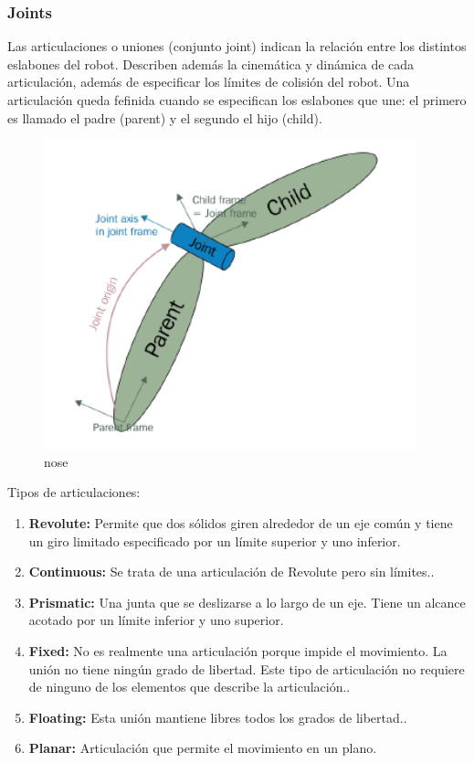                                 \newpage

        
        \subsubsection{Joints}
        
        Las articulaciones o uniones (conjunto joint) indican la relación entre los distintos eslabones del robot. Describen además la cinemática y dinámica de cada articulación, además de especificar los límites de colisión del robot. Una articulación queda fefinida cuando se especifican los eslabones que une: el primero es llamado el padre (parent) y el segundo el hijo (child).
        
        \begin{figure}[htb]
            \centering
            \includegraphics[width=0.65\linewidth]{Main/Chapter3/Images3/3-8/representacion-de-una-articulacion-en-URDF.png}
            \caption{nose}
            \label{f:Cap3-8_nose_nose}
        \end{figure} 
        
        Tipos de articulaciones:
        
        \begin{enumerate}
           \item \textbf{Revolute:} Permite que dos sólidos giren alrededor de un eje común y tiene un giro limitado especificado por un límite superior y uno inferior.
            \item \textbf{Continuous:} Se trata de una articulación de Revolute pero sin límites..
            \item \textbf{Prismatic:} Una junta que se deslizarse a lo largo de un eje. Tiene un alcance acotado por un límite inferior y uno superior.
            \item \textbf{Fixed:} No es realmente una articulación porque impide el movimiento. La unión no tiene ningún grado de libertad. Este tipo de articulación no requiere de ninguno de los elementos que describe la articulación..
            \item \textbf{Floating:} Esta unión mantiene libres todos los grados de libertad..
            \item \textbf{Planar:} Articulación que permite el movimiento en un plano.
        \end{enumerate}
        
